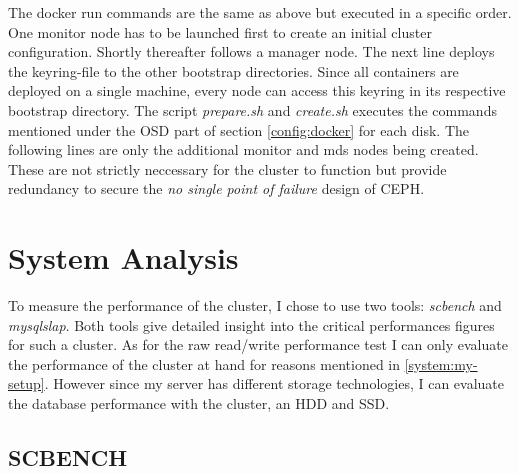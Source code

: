 \documentclass[titlepage, a4paper, 11pt]{scrartcl}
\begin{document}
                The docker run commands are the same as above but executed in a specific order. One monitor node has to be launched first to create an initial cluster configuration.
                Shortly thereafter follows a manager node. The next line deploys the keyring-file to the other bootstrap directories. Since all containers are deployed on a single machine, every node can access this keyring in its respective bootstrap directory. The script \textit{prepare.sh} and \textit{create.sh} executes the commands mentioned under the OSD part of section \ref*{config:docker} for each disk.
                The following lines are only the additional monitor and mds nodes being created. These are not strictly neccessary for the cluster to function but provide redundancy to secure the \textit{no single point of failure} design of CEPH.

    \section{System Analysis}

        

        To measure the performance of the cluster, I chose to use two tools: \textit{scbench} and \textit{mysqlslap}. Both tools give detailed insight into
        the critical performances figures for such a cluster. As for the raw read/write performance test I can only evaluate the performance of the cluster at hand for reasons mentioned 
        in \ref*{system:my-setup}. However since my server has different storage technologies, I can evaluate the database performance with the cluster, an HDD and SSD.

        \subsection{SCBENCH} 

        
\end{document}
